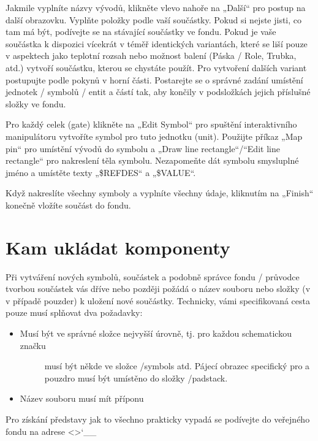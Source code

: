 \documentclass[letterpaper,10pt,czech]{sphinxmanual}
\begin{document}
Jakmile vyplníte názvy vývodů, klikněte vlevo nahoře na „Další“ pro postup na další obrazovku. Vyplňte položky podle  vaší součástky. Pokud si nejste jisti, co tam má být, podívejte se na stávající součástky ve fondu. Pokud je vaše součástka k dispozici vícekrát v téměř identických variantách, které se liší pouze v aspektech jako teplotní rozsah nebo možnost balení (Páska / Role, Trubka, atd.) vytvoří součástku, kterou se chystáte použít. Pro vytvoření dalších variant postupujte podle pokynů v horní části. Postarejte se o správné zadání umístění jednotek / symbolů / entit a částí tak, aby končily v podsložkách jejich příslušné složky ve fondu.

Pro každý celek (gate) klikněte na „Edit Symbol“ pro spuštění interaktivního
manipulátoru vytvoříte symbol pro tuto jednotku (unit). Použijte příkaz „Map pin“
pro umístění vývodů do symbolu a „Draw line rectangle“/“Edit line
rectangle“ pro nakreslení těla symbolu. Nezapomeňte dát symbolu
smysluplné jméno a umístěte texty „\$REFDES“ a „\$VALUE“.

Když nakreslíte všechny symboly a vyplníte všechny údaje,
kliknutím na „Finish“ konečně vložíte součást do fondu.


\section{Kam ukládat komponenty}
\label{\detokenize{pool-mgr:kam-ukladat-komponenty}}
Při vytváření nových symbolů, součástek a podobně správce fondu / průvodce  tvorbou součástek vás dříve nebo později požádá o název souboru nebo složky (v
v případě pouzder) k uložení nové součástky. Technicky, vámi specifikovaná cesta pouze musí splňovat dva požadavky:
\begin{itemize}
\item {} \begin{description}
\item[{Musí být ve správné  složce nejvyšší úrovně, tj. pro každou schematickou značku}] \leavevmode
musí být někde ve složce /symbols atd. Pájecí obrazec specifický pro a
pouzdro musí být umístěno do složky /padstack.

\end{description}

\item {} 
Název souboru musí mít příponu 

\end{itemize}

Pro získání představy jak to všechno prakticky vypadá se podívejte do veřejného fondu na adrese
\textless{}\textgreater{}{}`\_\_
\end{document}
